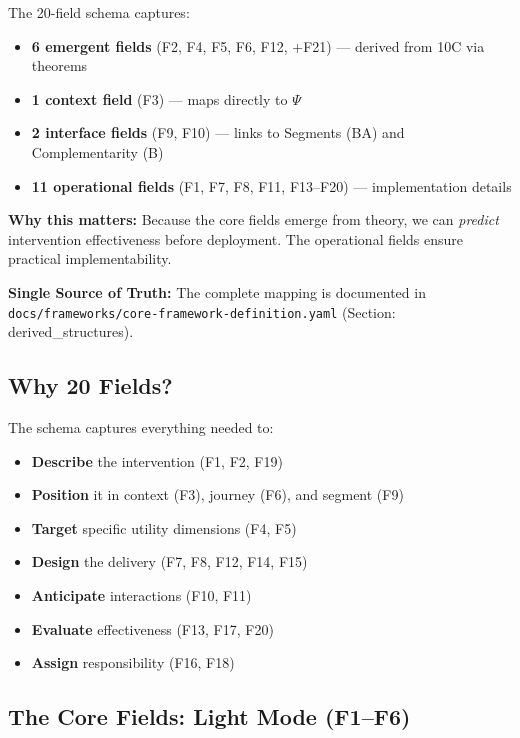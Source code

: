 \begin{tcolorbox}[colback=gray!5!white, colframe=gray!75!black,
    title=Implication for Practice]
The 20-field schema captures:
\begin{itemize}[nosep]
    \item \textbf{6 emergent fields} (F2, F4, F5, F6, F12, +F21) --- derived from 10C via theorems
    \item \textbf{1 context field} (F3) --- maps directly to $\Psi$
    \item \textbf{2 interface fields} (F9, F10) --- links to Segments (BA) and Complementarity (B)
    \item \textbf{11 operational fields} (F1, F7, F8, F11, F13--F20) --- implementation details
\end{itemize}

\textbf{Why this matters:} Because the core fields emerge from theory, we can \textit{predict} intervention effectiveness before deployment. The operational fields ensure practical implementability.

\textbf{Single Source of Truth:} The complete mapping is documented in \texttt{docs/frameworks/core-framework-definition.yaml} (Section: derived\_structures).
\end{tcolorbox}

\subsection{Why 20 Fields?}

The schema captures everything needed to:
\begin{itemize}
\item \textbf{Describe} the intervention (F1, F2, F19)
\item \textbf{Position} it in context (F3), journey (F6), and segment (F9)
\item \textbf{Target} specific utility dimensions (F4, F5)
\item \textbf{Design} the delivery (F7, F8, F12, F14, F15)
\item \textbf{Anticipate} interactions (F10, F11)
\item \textbf{Evaluate} effectiveness (F13, F17, F20)
\item \textbf{Assign} responsibility (F16, F18)
\end{itemize}

\subsection{The Core Fields: Light Mode (F1--F6)}

